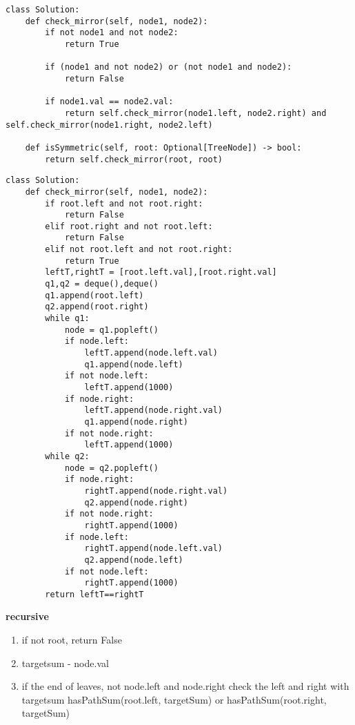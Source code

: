\documentclass{assignmeownt}
\begin{document}
\begin{lstlisting}[caption= recursion]
    class Solution:
    def check_mirror(self, node1, node2):
        if not node1 and not node2:
            return True

        if (node1 and not node2) or (not node1 and node2):
            return False
        
        if node1.val == node2.val:
            return self.check_mirror(node1.left, node2.right) and self.check_mirror(node1.right, node2.left)

    def isSymmetric(self, root: Optional[TreeNode]) -> bool:
        return self.check_mirror(root, root)

\end{lstlisting}

\begin{lstlisting}[caption=iterative]
    class Solution:
    def check_mirror(self, node1, node2):
        if root.left and not root.right:
            return False
        elif root.right and not root.left:
            return False
        elif not root.left and not root.right:
            return True
        leftT,rightT = [root.left.val],[root.right.val]
        q1,q2 = deque(),deque()
        q1.append(root.left)
        q2.append(root.right)
        while q1:
            node = q1.popleft()
            if node.left:
                leftT.append(node.left.val)
                q1.append(node.left)
            if not node.left:
                leftT.append(1000)
            if node.right:
                leftT.append(node.right.val)
                q1.append(node.right)
            if not node.right:
                leftT.append(1000)
        while q2:
            node = q2.popleft()
            if node.right:
                rightT.append(node.right.val)
                q2.append(node.right)
            if not node.right:
                rightT.append(1000)
            if node.left:
                rightT.append(node.left.val)
                q2.append(node.left)
            if not node.left:
                rightT.append(1000)
        return leftT==rightT

\end{lstlisting}

\textbf{recursive}
\begin{enumerate}
    \item if not root, return False
    \item targetsum - node.val
    \item if the end of leaves, not node.left and node.right check the left and right with targetsum hasPathSum(root.left, targetSum) or hasPathSum(root.right, targetSum)
\end{enumerate}
\end{document}
